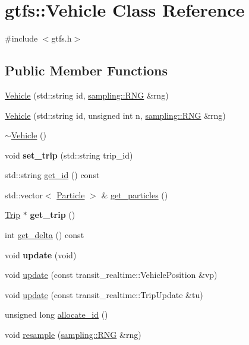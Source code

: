 \hypertarget{classgtfs_1_1Vehicle}{}\section{gtfs\+:\+:Vehicle Class Reference}
\label{classgtfs_1_1Vehicle}


{\ttfamily \#include $<$gtfs.\+h$>$}

\subsection*{Public Member Functions}
\begin{DoxyCompactItemize}
\item 
\hyperlink{classgtfs_1_1Vehicle_a8838934149e47eeb7160f1755012dcd4}{Vehicle} (std\+::string id, \hyperlink{classsampling_1_1RNG}{sampling\+::\+R\+NG} \&rng)
\item 
\hyperlink{classgtfs_1_1Vehicle_a12765a61077b4be7e65ab67b63eb9fcc}{Vehicle} (std\+::string id, unsigned int n, \hyperlink{classsampling_1_1RNG}{sampling\+::\+R\+NG} \&rng)
\item 
\hyperlink{classgtfs_1_1Vehicle_a08c7450dd0df9406f78b30be044d27d8}{$\sim$\+Vehicle} ()
\item 
\mbox{\label{classgtfs_1_1Vehicle_ad8f6cf91e89d6ba1199bf805c0b67b98}} 
void {\bfseries set\+\_\+trip} (std\+::string trip\+\_\+id)
\item 
std\+::string \hyperlink{classgtfs_1_1Vehicle_a6b388986c9ed4af1eb86f13a3d2de8e0}{get\+\_\+id} () const
\item 
std\+::vector$<$ \hyperlink{classgtfs_1_1Particle}{Particle} $>$ \& \hyperlink{classgtfs_1_1Vehicle_a7b12b079c68880f00f532ca25858c368}{get\+\_\+particles} ()
\item 
\mbox{\label{classgtfs_1_1Vehicle_a71319d7bb44820a5bfc418f363d2d77d}} 
\hyperlink{classgtfs_1_1Trip}{Trip} $\ast$ {\bfseries get\+\_\+trip} ()
\item 
int \hyperlink{classgtfs_1_1Vehicle_a23c0a191559e4066423d5f3cbfb70b46}{get\+\_\+delta} () const
\item 
\mbox{\label{classgtfs_1_1Vehicle_aab490aeda8084cfcb8de29f0aedaa416}} 
void {\bfseries update} (void)
\item 
void \hyperlink{classgtfs_1_1Vehicle_a50ae70c92d958437a2196b0ce81acff0}{update} (const transit\+\_\+realtime\+::\+Vehicle\+Position \&vp)
\item 
void \hyperlink{classgtfs_1_1Vehicle_a4cc25a17473bf7bccc39b37ef5d7c956}{update} (const transit\+\_\+realtime\+::\+Trip\+Update \&tu)
\item 
unsigned long \hyperlink{classgtfs_1_1Vehicle_aa9087e973a9821f384ec47f51bdcedc7}{allocate\+\_\+id} ()
\item 
void \hyperlink{classgtfs_1_1Vehicle_a8367fc70a64b7e596422f880dbff1193}{resample} (\hyperlink{classsampling_1_1RNG}{sampling\+::\+R\+NG} \&rng)
\end{DoxyCompactItemize}
